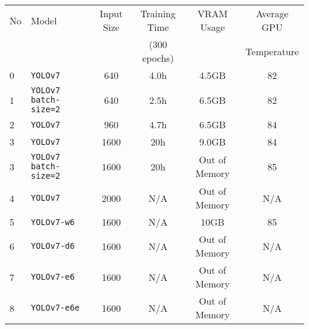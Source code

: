 \begin{tabular}{ l l c c c c}
  \toprule[1.5pt]
  No & Model                                       &  Input Size   &Training Time                 &VRAM Usage & Average GPU             \\
     &                                             &               &              (300 epochs)    &           &             Temperature \\
  \midrule
  0  & \texttt{YOLOv7}                             &     640       & 4.0h                         &4.5GB          &  82                     \\
  1  & \texttt{YOLOv7 batch-size=2}                &     640       & 2.5h                         &6.5GB          &  82                     \\
  2  & \texttt{YOLOv7}                             &     960       & 4.7h                         &6.5GB          &  84                     \\
  3  & \texttt{YOLOv7}                             &     1600      & 20h                          &9.0GB          &  84                     \\
  3  & \texttt{YOLOv7 batch-size=2}                &     1600      & 20h                          &Out of Memory  &  85                     \\
  4  & \texttt{YOLOv7}                             &     2000      & N/A                          &Out of Memory  &  N/A                    \\
  5  & \texttt{YOLOv7-w6}                          &     1600      & N/A                          &10GB           &  85                     \\
  6  & \texttt{YOLOv7-d6}                          &     1600      & N/A                          &Out of Memory  &  N/A                    \\
  7  & \texttt{YOLOv7-e6}                          &     1600      & N/A                          &Out of Memory  &  N/A                    \\
  8  & \texttt{YOLOv7-e6e}                         &     1600      & N/A                          &Out of Memory  &  N/A                    \\
  \bottomrule[1.5pt]
\end{tabular}